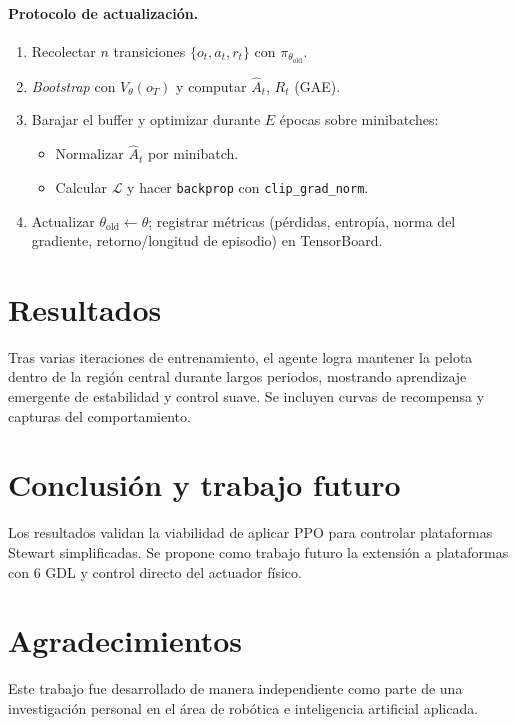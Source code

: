 \documentclass[conference]{IEEEtran}
\begin{document}
\paragraph{Protocolo de actualización.}
\begin{enumerate}
\item Recolectar $n$ transiciones $\{o_t,a_t,r_t\}$ con $\pi_{\theta_{\mathrm{old}}}$.
\item \textit{Bootstrap} con $V_\theta(o_{T})$ y computar $\hat A_t$, $R_t$ (GAE).
\item Barajar el buffer y optimizar durante $E$ épocas sobre mini\-batches:
  \begin{itemize}
  \item Normalizar $\hat A_t$ por minibatch.
  \item Calcular $\mathcal{L}$ y hacer \texttt{backprop} con \texttt{clip\_grad\_norm}.
  \end{itemize}
\item Actualizar $\theta_{\mathrm{old}}\!\leftarrow\!\theta$; registrar métricas (pérdidas, entropía, norma del gradiente, retorno/longitud de episodio) en TensorBoard.
\end{enumerate}

\section{Resultados}
Tras varias iteraciones de entrenamiento, el agente logra mantener la pelota dentro de la región central durante largos periodos, mostrando aprendizaje emergente de estabilidad y control suave. Se incluyen curvas de recompensa y capturas del comportamiento.

\section{Conclusión y trabajo futuro}
Los resultados validan la viabilidad de aplicar PPO para controlar plataformas Stewart simplificadas. Se propone como trabajo futuro la extensión a plataformas con 6 GDL y control directo del actuador físico.

\section*{Agradecimientos}
Este trabajo fue desarrollado de manera independiente como parte de una investigación personal en el área de robótica e inteligencia artificial aplicada.
\end{document}
